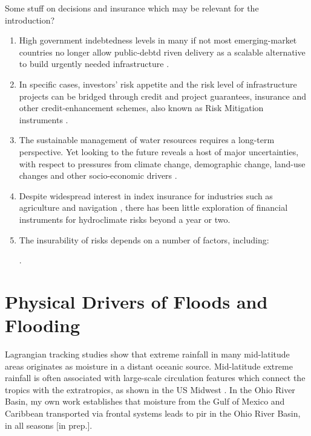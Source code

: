 \documentclass[11pt]{article}
\begin{document}
Some stuff on decisions and insurance which may be relevant for the introduction?
\begin{enumerate}
  \item High government indebtedness levels in many if not most emerging-market countries no longer allow public-debtd riven delivery as a scalable alternative to build urgently needed infrastructure \citep{WEF-instruments-2016}.
  \item In specific cases, investors' risk appetite and the risk level of infrastructure projects can be bridged through credit and project guarantees, insurance and other credit-enhancement schemes, also known as Risk Mitigation instruments \citep{WEF-instruments-2016}.
  \item The sustainable management of water resources requires a long-term perspective.
  Yet looking to the future reveals a host of major uncertainties, with respect to pressures from climate change, demographic change, land-use changes and other socio-economic drivers \citep{Hall2012}.
  \item Despite widespread interest in index insurance for industries such as agriculture \citep{Clarke2013} and navigation \citep{Meyer2016}, there has been little exploration of financial instruments for hydroclimate risks beyond a year or two.
  \item The insurability of risks depends on a number of factors, including:
   \citep{Wolfrom2016}.
\end{enumerate}


\section{Physical Drivers of Floods and Flooding}

Lagrangian tracking studies \citep{Gimeno2010} show that extreme rainfall in many mid-latitude areas originates as moisture in a distant oceanic source.
Mid-latitude extreme rainfall is often associated with large-scale circulation features which connect the tropics with the extratropics, as shown in the US Midwest \citep{Dirmeyer2010}.
In the Ohio River Basin, my own work establishes that moisture from the Gulf of Mexico and Caribbean transported via frontal systems leads to {pir} in the Ohio River Basin, in all seasons [in prep.].
\end{document}
